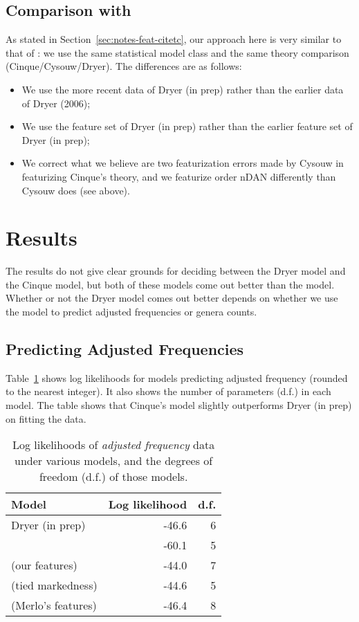 \documentclass[11pt]{article}
\begin{document}
\subsection{Comparison with \citet{cysouw2010towards}}
\label{sec:comp-with-citetcys}

As stated in Section~\ref{sec:notes-feat-citetc}, our approach here is
very similar to that of \citet{cysouw2010towards}: we use the same
statistical model class and the same theory comparison
(Cinque/Cysouw/Dryer).  The differences are as follows:
%
\begin{itemize}
\item We use the more recent data of Dryer (in prep) rather than the
  earlier data of Dryer (2006);
\item We use the feature set of Dryer (in prep) rather than the
  earlier feature set of Dryer (in prep);
\item We correct what we believe are two featurization errors made by
  Cysouw in featurizing Cinque's theory, and we featurize order nDAN
  differently than Cysouw does (see above).
\end{itemize}


\section{Results}

The results do not give clear grounds for deciding between the Dryer model and the Cinque model, but both of these models come out better than the \citet{cysouw2010dealing} model. Whether or not the Dryer model comes out better depends on whether we use the model to predict adjusted frequencies or genera counts.

\subsection{Predicting Adjusted Frequencies}

Table~\ref{tab:af-likelihoods} shows log likelihoods for models predicting adjusted frequency (rounded to the nearest integer). It also shows the number of parameters (d.f.) in each model. The table shows that Cinque's model slightly outperforms Dryer (in prep) on fitting the data.

\begin{table}
  \centering
  \begin{tabular}{|l|r|r|}
    \hline
    Model & Log likelihood & d.f. \\
    \hline
    Dryer (in prep) & -46.6 & 6 \\
    \citet{cysouw2010dealing} & -60.1 & 5 \\
    \citet{cinque2005deriving} (our features) & -44.0 & 7 \\
    \citet{cinque2005deriving} (tied markedness) & -44.6 & 5 \\
    \citet{cinque2005deriving} (Merlo's features) & -46.4 & 8\\
    \hline
  \end{tabular}
  \caption{Log likelihoods of \emph{adjusted frequency} data under various models, and the degrees of freedom (d.f.) of those models.}
  \label{tab:af-likelihoods}
\end{table}
\end{document}
